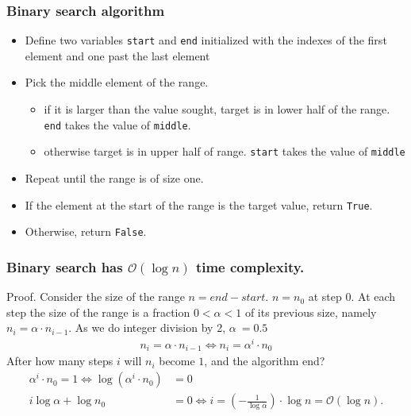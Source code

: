 \documentclass{beamer} %
\begin{document}
\begin{frame}
\frametitle{Binary search algorithm} 

\begin{itemize}
\item Define two variables \texttt{start} and \texttt{end} initialized with the indexes of the first element and one past the last element
\item Pick the middle element of the range.
  \begin{itemize}
  \item if it is larger than the value sought, target is in lower half of the range.  {\tt end} takes the value of \texttt{middle}.
  \item otherwise target is in upper half of range.  \texttt{start} takes the value of \texttt{middle}
  \end{itemize}
\item Repeat until the range is of size one.
\item If the element at the start of the range is the target value, return \texttt{True}. 
\item Otherwise, return \texttt{False}.
\end{itemize}

\end{frame}




\begin{frame}
\frametitle{Binary search has $\mathcal{O}(\log n)$ time complexity.}

\vspace{3mm}
Proof. Consider the size of the range $n = end - start$.  $n = n_0$ at step 0. At each step the size of the range is a fraction $0 < \alpha < 1$ of its previous size, namely $n_i = \alpha \cdot n_{i-1}$.  As we do integer division by 2, $\alpha ~= 0.5$
\begin{align}
n_i = \alpha \cdot n_{i-1} \Leftrightarrow n_i = \alpha^i \cdot n_{0}
\end{align}
After how many steps $i$ will $n_i$ become $1$, and the algorithm end?
\begin{align}
\alpha^i \cdot n_{0} = 1 \Leftrightarrow \log (\alpha^i \cdot n_{0}) &= 0 \\
i \log \alpha + \log n_{0} &= 0 \Leftrightarrow i = \left( - \frac{1}{\log \alpha} \right) \cdot \log n = \mathcal{O}(\log n).
\end{align}

\end{frame}
\end{document}
